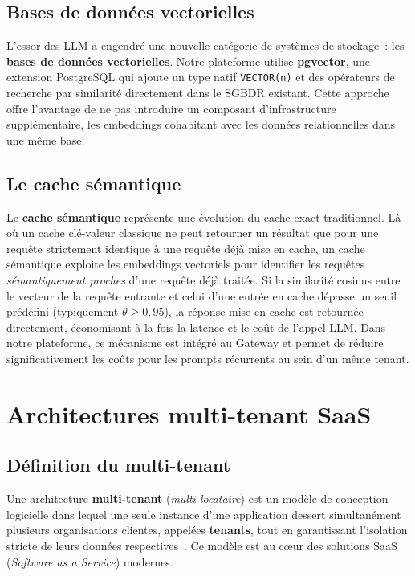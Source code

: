 \subsection{Bases de données vectorielles}

L'essor des LLM a engendré une nouvelle catégorie de systèmes de stockage~: les \textbf{bases de données vectorielles}. Notre plateforme utilise \textbf{pgvector}, une extension PostgreSQL qui ajoute un type natif \texttt{VECTOR(n)} et des opérateurs de recherche par similarité directement dans le SGBDR existant. Cette approche offre l'avantage de ne pas introduire un composant d'infrastructure supplémentaire, les embeddings cohabitant avec les données relationnelles dans une même base.

\subsection{Le cache sémantique}

Le \textbf{cache sémantique} représente une évolution du cache exact traditionnel. Là où un cache clé-valeur classique ne peut retourner un résultat que pour une requête strictement identique à une requête déjà mise en cache, un cache sémantique exploite les embeddings vectoriels pour identifier les requêtes \textit{sémantiquement proches} d'une requête déjà traitée. Si la similarité cosinus entre le vecteur de la requête entrante et celui d'une entrée en cache dépasse un seuil prédéfini (typiquement $\theta \geq 0{,}95$), la réponse mise en cache est retournée directement, économisant à la fois la latence et le coût de l'appel LLM. Dans notre plateforme, ce mécanisme est intégré au Gateway et permet de réduire significativement les coûts pour les prompts récurrents au sein d'un même tenant.


\section{Architectures multi-tenant SaaS}
\label{sec:multitenant}

\subsection{Définition du multi-tenant}

Une architecture \textbf{multi-tenant} (\textit{multi-locataire}) est un modèle de conception logicielle dans lequel une seule instance d'une application dessert simultanément plusieurs organisations clientes, appelées \textbf{tenants}, tout en garantissant l'isolation stricte de leurs données respectives~\cite{bezemer2010}. Ce modèle est au c\oe ur des solutions SaaS (\textit{Software as a Service}) modernes.

